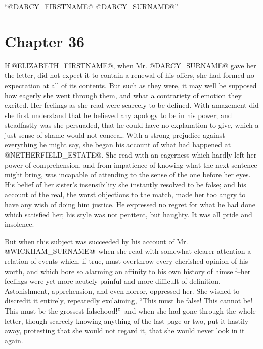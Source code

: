 ``@DARCY_FIRSTNAME@ @DARCY_SURNAME@''



\chapter*{Chapter 36}


If @ELIZABETH_FIRSTNAME@, when Mr. @DARCY_SURNAME@ gave her the letter, did not expect it to
contain a renewal of his offers, she had formed no expectation at all of
its contents. But such as they were, it may well be supposed how eagerly
she went through them, and what a contrariety of emotion they excited.
Her feelings as she read were scarcely to be defined. With amazement did
she first understand that he believed any apology to be in his power;
and steadfastly was she persuaded, that he could have no explanation
to give, which a just sense of shame would not conceal. With a strong
prejudice against everything he might say, she began his account of what
had happened at @NETHERFIELD_ESTATE@. She read with an eagerness which hardly
left her power of comprehension, and from impatience of knowing what the
next sentence might bring, was incapable of attending to the sense of
the one before her eyes. His belief of her sister's insensibility she
instantly resolved to be false; and his account of the real, the worst
objections to the match, made her too angry to have any wish of doing
him justice. He expressed no regret for what he had done which satisfied
her; his style was not penitent, but haughty. It was all pride and
insolence.

But when this subject was succeeded by his account of Mr. @WICKHAM_SURNAME@--when
she read with somewhat clearer attention a relation of events which,
if true, must overthrow every cherished opinion of his worth, and which
bore so alarming an affinity to his own history of himself--her
feelings were yet more acutely painful and more difficult of definition.
Astonishment, apprehension, and even horror, oppressed her. She wished
to discredit it entirely, repeatedly exclaiming, ``This must be false!
This cannot be! This must be the grossest falsehood!''--and when she had
gone through the whole letter, though scarcely knowing anything of the
last page or two, put it hastily away, protesting that she would not
regard it, that she would never look in it again.

